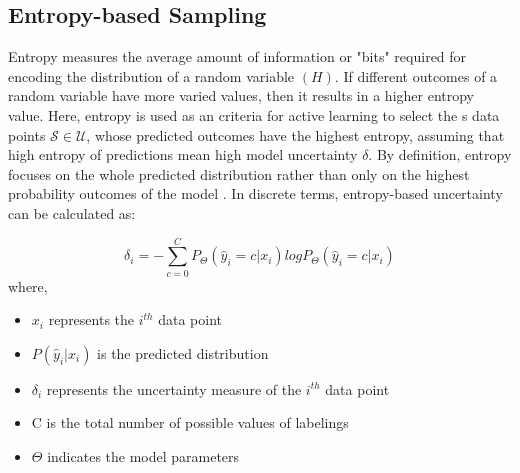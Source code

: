 \subsection{Entropy-based Sampling}
Entropy measures the average amount of information or "bits" required for encoding the distribution of a random variable \cite{shannon1948} $(H)$. If different outcomes of a random variable have more varied values, then it results in a higher entropy value. Here, entropy is used as an criteria for active learning \cite{settles2009} to select the s data points $\mathcal{S} \in \mathcal{U}$, whose predicted outcomes have the highest entropy, assuming that high entropy of predictions mean high model uncertainty $\delta$. By definition, entropy focuses on the whole predicted distribution rather than only on the highest probability outcomes of the model \cite{settles2009}. In discrete terms, entropy-based uncertainty can be calculated as:

\begin{equation}
    \label{equation:entropy_sampling}
    \delta_{i} = - \sum_{c=0}^{C} P_{\Theta}(\hat{y}_i = c|x_i)logP_{\Theta}(\hat{y}_i = c|x_i)
\end{equation}
where,
\begin{itemize}[label={}]
  \setlength\itemsep{0em}
  \item $x_i$ represents the $i^{th}$ data point
  \item $P(\hat{y}_i|x_i)$ is the predicted distribution
  \item $\delta_{i}$ represents the uncertainty measure of the $i^{th}$ data point
  \item C is the total number of possible values of labelings
  \item $\Theta$ indicates the model parameters
\end{itemize}


